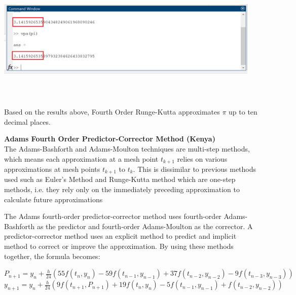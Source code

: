 \documentclass[letterpaper,12pt]{article}
\begin{document}
\begin{center}
    \includegraphics[width=5in, height=2in]{RungeKResult.png}
\end{center}
\\
\indent Based on the results above, Fourth Order Runge-Kutta approximates $\pi$ up to ten decimal places.
    \item \textbf{Adams Fourth Order Predictor-Corrector Method (Kenya)}
    \\ \indent The Adams-Bashforth and Adams-Moulton techniques are multi-step methods, which means each approximation at a mesh point $t_{k+1}$ relies on various approximations at mesh points $t_{k+1}$ to $t_{k}$. This is dissimilar to previous methods used such as Euler’s Method and Runge-Kutta method which are one-step methods, i.e. they rely only on the immediately preceding approximation to calculate future approximations \cite{Burden15}
    
    The Adams fourth-order predictor-corrector method uses fourth-order Adams-Bashforth as the predictor and fourth-order Adams-Moulton as the corrector. A predictor-corrector method uses an explicit method to predict and implicit method to correct or improve the approximation. 
    By using these methods together, the formula becomes: 
    \begin{center}$P_{n+1}=y_{n} + \frac{h}{24}(55f(t_{n},y_{n})-59f(t_{n-1},y_{n-1})+37f(t_{n-2},y_{n-2})-9f(t_{n-3},y_{n-3}))$
    \\$y_{n+1}=y_{n}+\frac{h}{24}(9f(t_{n+1},P_{n+1})+19f(t_{n},y_{n})-5f(t_{n-1},y_{n-1})+f(t_{n-2},y_{n-2}))$ \cite{Burden15}
    \end{center}
\end{document}
